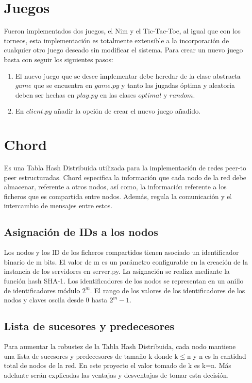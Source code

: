 \documentclass[10pt, a4paper]{article}
\begin{document}
    \section{Juegos}
    Fueron implementados dos juegos, el Nim y el Tic-Tac-Toe, al igual que con los torneos, esta implementación es totalmente extensible a la incorporación de cualquier otro juego deseado sin modificar el sistema. Para crear un nuevo juego basta con seguir los siguientes pasos:
    \begin{enumerate}
    	\item El nuevo juego que se desee implementar debe heredar de la clase abstracta $game$ que se encuentra en $game.py$ y tanto las jugadas \'optima y aleatoria deben ser hechas en $play.py$ en las clases $optimal$ y $random$.
    	\item En $client.py$ añadir la opción de crear el nuevo juego añadido.
    \end{enumerate}
    
    \section{Chord}
    Es una Tabla Hash Distribuida utilizada para la implementación de redes peer-to peer estructuradas. Chord especifica la información que cada nodo de la red debe almacenar, referente a otros nodos, así como, la información referente a los ficheros que es compartida entre nodos. Además, regula la comunicación y el intercambio de mensajes entre estos.\\
    
    \subsection{Asignaci\'on de IDs a los nodos}
    Los nodos y los ID de los ficheros compartidos tienen asociado un identificador binario de m bits. El valor de m es un parámetro configurable en la creación de la instancia de los servidores en server.py. La asignación se realiza mediante la función hash SHA-1. Los identificadores de los nodos se representan en un anillo de identificadores módulo $2^m$. El rango de los valores de los identificadores de los nodos y claves oscila desde 0 hasta $2^m-1$.\\
    
    \subsection{Lista de sucesores y predecesores}
    Para aumentar la robustez de la Tabla Hash Distribuida, cada nodo mantiene una lista de sucesores y predecesores de tamaño k donde k$\leq$n y n es la cantidad total de nodos de la red. En este proyecto el valor tomado de k es k=n. Más adelante serán explicadas las ventajas y desventajas de tomar esta decisión.\\
    
\end{document}
